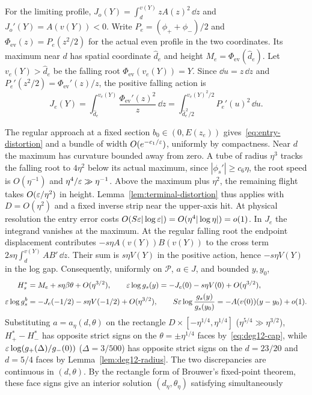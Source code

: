 For the limiting profile, $J_o(Y)=\int_d^{v(Y)}zA(z)^2\,\dd z$
and $J_o'(Y)=A(v(Y))<0$. Write $P_e=(\phi_++\phi_-)/2$ and
$\Phi_{\mathrm{ev}}(z)=P_e(z^2/2)$ for the actual even profile in the
two coordinates. Its maximum near $d$ has spatial coordinate
$\widehat d_e$ and height $M_e=\Phi_{\mathrm{ev}}(\widehat d_e)$.
Let $v_e(Y)>\widehat d_e$ be the falling root
$\Phi_{\mathrm{ev}}(v_e(Y))=Y$. Since $\dd u=z\,\dd z$ and
$P_e'(z^2/2)=\Phi_{\mathrm{ev}}'(z)/z$, the positive falling action is
\[
 J_e(Y)=\int_{\widehat d_e}^{v_e(Y)}
           \frac{\Phi_{\mathrm{ev}}'(z)^2}{z}\,\dd z
       =\int_{\widehat d_e^{\,2}/2}^{v_e(Y)^2/2} P_e'(u)^2\,\dd u .
\]

The regular approach at a fixed section $b_0\in(0,E(z_e))$
gives~\eqref{eq:entry-distortion} and a bundle of width
$O(e^{-c_1/\varepsilon})$, uniformly by compactness. Near $d$ the maximum
has curvature bounded away from zero. A tube of radius $\eta^3$
tracks the falling root to $4\eta^2$ below its actual maximum,
since $|\phi_s'|\ge c_6\eta$, the root speed is $O(\eta^{-1})$
and $\eta^4/\varepsilon\gg\eta^{-1}$. Above the maximum plus $\eta^2$,
the remaining flight takes $O(\varepsilon/\eta^2)$ in height.
Lemma~\ref{lem:terminal-distortion} thus applies with $D=O(\eta^2)$
and a fixed inverse strip near the upper-axis hit. At physical
resolution the entry error costs
$O(S\varepsilon|\log\varepsilon|)=O(\eta^4|\log\eta|)=o(1)$.
In $J_e$ the integrand vanishes at the maximum. At the regular falling
root the endpoint displacement contributes $-s\eta A(v(Y))B(v(Y))$
to the cross term $2s\eta\int_d^{v(Y)}AB'\,\dd z$. Their sum is
$s\eta V(Y)$ in the positive action, hence $-s\eta V(Y)$ in the log gap.
Consequently, uniformly on $\mathcal P$, $a\in J$, and bounded $y,y_0$,
\begin{align}
  H_s^* &= M_e + s\eta\beta\theta + O(\eta^{3/2}),\qquad
  \varepsilon\log g_s(y) = -J_e(0) - s\eta V(0) + O(\eta^{3/2}),\label{eq:deg12-cap}\\
  \varepsilon\log g_s^b &= -J_e(-1/2) - s\eta V(-1/2) + O(\eta^{3/2}),\qquad
  S\varepsilon\log\frac{g_s(y)}{g_s(y_0)} = -A(v(0))(y-y_0) + o(1).\label{eq:deg12-fine}
\end{align}
Substituting $a=a_\eta(d,\theta)$ on the rectangle $D\times[-\eta^{1/4},\eta^{1/4}]$ ($\eta^{5/4}\gg\eta^{3/2}$), $H_+^*-H_-^*$ has opposite strict signs on the $\theta=\pm\eta^{1/4}$ faces by~\eqref{eq:deg12-cap}, while $\varepsilon\log(g_+(\Delta)/g_-(0))$ ($\Delta=3/500$) has opposite strict signs on the $d=23/20$ and $d=5/4$ faces by Lemma~\ref{lem:deg12-radius}. The two discrepancies are continuous in $(d,\theta)$. By the rectangle form of Brouwer's fixed-point theorem, these face signs give an interior solution $(d_\eta,\theta_\eta)$ satisfying simultaneously
